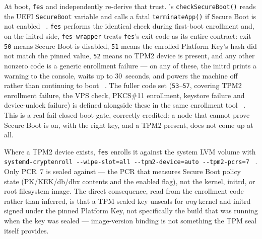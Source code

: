 At boot, \texttt{fes} and \fluxsas independently re-derive that trust. \fluxsas's
\texttt{check\allowbreak{}Secure\allowbreak{}Boot()} reads the UEFI \texttt{SecureBoot} variable and calls a fatal
\texttt{terminateApp()} if Secure Boot is not enabled \shipped~.
\texttt{fes} performs the identical check during first-boot enrollment and, on the initrd side,
\texttt{fes-wrapper} treats \texttt{fes}'s exit code as its entire contract: exit \texttt{50}
means Secure Boot is disabled, \texttt{51} means the enrolled Platform Key's hash did not match
the pinned value, \texttt{52} means no TPM2 device is present, and any other nonzero code is a
generic enrollment failure — on any of these, the initrd prints a warning to the console, waits
up to 30~seconds, and powers the machine off rather than continuing to boot
\shipped~. The fuller code set
(\texttt{53}--\texttt{57}, covering TPM2 enrollment failure, the VPS check, PKCS\#11 enrollment,
keystore failure and device-unlock failure) is defined alongside these in the same enrollment
tool \shipped~. This is a real fail-closed boot gate,
correctly credited: a node that cannot prove Secure Boot is on, with the right key, and a TPM2
present, does not come up at all.

Where a TPM2 device exists, \texttt{fes} enrolls it against the system LVM volume with
\texttt{systemd-\allowbreak{}cryptenroll -\allowbreak{}-\allowbreak{}wipe-\allowbreak{}slot=all -\allowbreak{}-\allowbreak{}tpm2-\allowbreak{}device=auto -\allowbreak{}-\allowbreak{}tpm2-\allowbreak{}pcrs=7}
\shipped~. Only PCR~7 is sealed against — the PCR that
measures Secure Boot policy state (PK/KEK/db/dbx contents and the enabled flag), not the kernel,
initrd, or root filesystem image. The direct consequence, read from the enrollment code rather
than inferred, is that a TPM-sealed key unseals for \emph{any} kernel and initrd signed under the
pinned Platform Key, not specifically the build that was running when the key was sealed —
image-version binding is not something the TPM seal itself provides.

